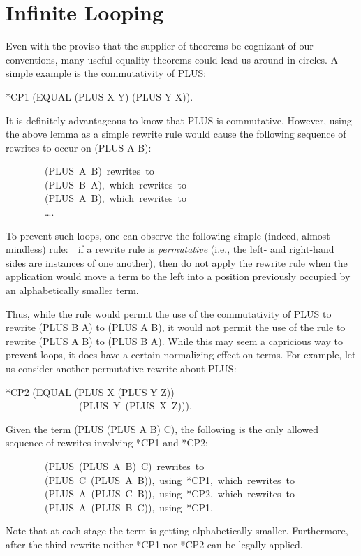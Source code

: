 \documentclass[10pt]{book}
\newenvironment{pubasis}{\begin{flushleft}}{\end{flushleft}}
\begin{document}
\section{Infinite Looping}
Even with the proviso that the supplier of theorems be cognizant of our
conventions, many useful equality theorems could lead us around in circles.
A simple example is the commutativity of PLUS:

\begin{pubasis}
*CP1	(EQUAL (PLUS X Y) (PLUS Y X)).\\
\end{pubasis}
It is definitely advantageous to know that PLUS is commutative.  However,
using the above lemma as a simple rewrite rule would cause the following
sequence of rewrites to occur on (PLUS A B):

\begin{pubasis}
~~~~~~~~(PLUS~A~B)~rewrites~to\\
~~~~~~~~(PLUS~B~A),~which~rewrites~to\\
~~~~~~~~(PLUS~A~B),~which~rewrites~to\\
~~~~~~~~\ldots{}.\\
\end{pubasis}

To prevent such loops, one can observe the following simple
(indeed, almost mindless) rule:~~if a rewrite rule is \emph{permutative}
(i.e., the left- and right-hand sides are instances of one another),
then do not apply the rewrite rule when the application
would move a term to the left into a position previously occupied
by an alphabetically smaller term.

Thus, while the rule would permit the use of the commutativity of
PLUS to rewrite (PLUS B A) to (PLUS A B), it would not permit the
use of the rule to rewrite (PLUS A B) to (PLUS B A).  While this may seem
a capricious way to prevent loops, it does have a certain
normalizing effect on terms.  For example, let us consider another
permutative rewrite about PLUS:

\begin{pubasis}
*CP2	(EQUAL (PLUS X (PLUS Y Z))\\
~~~~~~~~~~~~~~~(PLUS~Y~(PLUS~X~Z))).\\
\end{pubasis}
Given the term (PLUS (PLUS A B) C), the following is the only
allowed sequence of rewrites involving *CP1 and *CP2:

\begin{pubasis}
~~~~~~~~(PLUS~(PLUS~A~B)~C)~rewrites~to\\
~~~~~~~~(PLUS~C~(PLUS~A~B)),~using~*CP1,~which~rewrites~to\\
~~~~~~~~(PLUS~A~(PLUS~C~B)),~using~*CP2,~which~rewrites~to\\
~~~~~~~~(PLUS~A~(PLUS~B~C)),~using~*CP1.\\
\end{pubasis}
Note that at each stage the term is getting alphabetically smaller.
Furthermore, after the third rewrite neither *CP1 nor *CP2 can be legally
applied.
\end{document}

